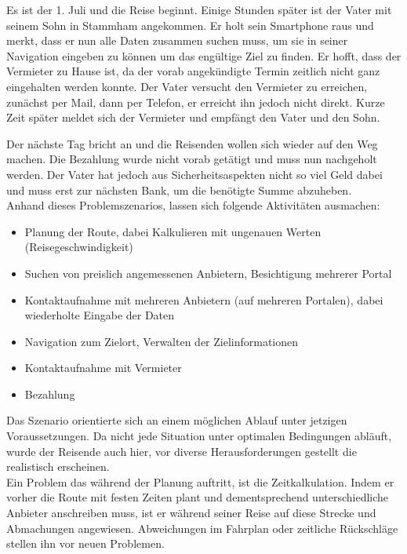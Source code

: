 Es ist der 1. Juli und die Reise beginnt. Einige Stunden später ist der Vater mit seinem Sohn in Stammham angekommen. Er holt sein Smartphone raus und merkt, dass er nun alle Daten zusammen suchen muss, um sie in seiner Navigation eingeben zu können um das engültige Ziel zu finden. Er hofft, dass der Vermieter zu Hause ist, da der vorab angekündigte Termin zeitlich nicht ganz eingehalten werden konnte. Der Vater versucht den Vermieter zu erreichen, zunächst per Mail, dann per Telefon, er erreicht ihn jedoch nicht direkt. Kurze Zeit später meldet sich der Vermieter und empfängt den Vater und den Sohn.

Der nächste Tag bricht an und die Reisenden wollen sich wieder auf den Weg machen. Die Bezahlung wurde nicht vorab getätigt und muss nun nachgeholt werden. Der Vater hat jedoch aus Sicherheitsaspekten nicht so viel Geld dabei und muss erst zur nächsten Bank, um die benötigte Summe abzuheben.\\


Anhand dieses Problemszenarios, lassen sich folgende Aktivitäten ausmachen:
\begin{itemize}
   \item 
   Planung der Route, dabei Kalkulieren mit ungenauen Werten (Reisegeschwindigkeit)
   \item 
   Suchen von preislich angemessenen Anbietern, Besichtigung mehrerer Portal
   \item 
   Kontaktaufnahme mit mehreren Anbietern (auf mehreren Portalen), dabei wiederholte Eingabe der Daten
   \item
   Navigation zum Zielort, Verwalten der Zielinformationen
   \item
   Kontaktaufnahme mit Vermieter
   \item
   Bezahlung

\end{itemize}

Das Szenario orientierte sich an einem möglichen Ablauf unter jetzigen Voraussetzungen. Da nicht jede Situation unter optimalen Bedingungen abläuft, wurde der Reisende auch hier, vor diverse Herausforderungen gestellt die realistisch erscheinen. \\
Ein Problem das während der Planung auftritt, ist die Zeitkalkulation. Indem er vorher die Route mit festen Zeiten plant und dementsprechend unterschiedliche Anbieter anschreiben muss, ist er während seiner Reise auf diese Strecke und Abmachungen angewiesen. Abweichungen im Fahrplan oder zeitliche Rückschläge stellen ihn vor neuen Problemen. 

